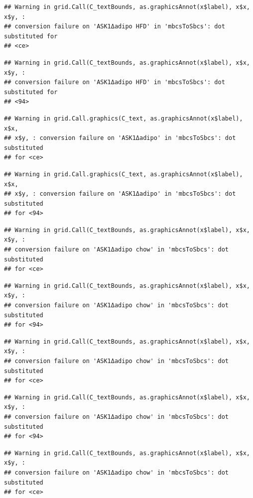 \documentclass[]{book}
\begin{document}
\begin{verbatim}
## Warning in grid.Call(C_textBounds, as.graphicsAnnot(x$label), x$x, x$y, :
## conversion failure on 'ASK1Δadipo HFD' in 'mbcsToSbcs': dot substituted for
## <ce>
\end{verbatim}

\begin{verbatim}
## Warning in grid.Call(C_textBounds, as.graphicsAnnot(x$label), x$x, x$y, :
## conversion failure on 'ASK1Δadipo HFD' in 'mbcsToSbcs': dot substituted for
## <94>
\end{verbatim}

\begin{verbatim}
## Warning in grid.Call.graphics(C_text, as.graphicsAnnot(x$label), x$x,
## x$y, : conversion failure on 'ASK1Δadipo' in 'mbcsToSbcs': dot substituted
## for <ce>
\end{verbatim}

\begin{verbatim}
## Warning in grid.Call.graphics(C_text, as.graphicsAnnot(x$label), x$x,
## x$y, : conversion failure on 'ASK1Δadipo' in 'mbcsToSbcs': dot substituted
## for <94>
\end{verbatim}

\begin{verbatim}
## Warning in grid.Call(C_textBounds, as.graphicsAnnot(x$label), x$x, x$y, :
## conversion failure on 'ASK1Δadipo chow' in 'mbcsToSbcs': dot substituted
## for <ce>
\end{verbatim}

\begin{verbatim}
## Warning in grid.Call(C_textBounds, as.graphicsAnnot(x$label), x$x, x$y, :
## conversion failure on 'ASK1Δadipo chow' in 'mbcsToSbcs': dot substituted
## for <94>
\end{verbatim}

\begin{verbatim}
## Warning in grid.Call(C_textBounds, as.graphicsAnnot(x$label), x$x, x$y, :
## conversion failure on 'ASK1Δadipo chow' in 'mbcsToSbcs': dot substituted
## for <ce>
\end{verbatim}

\begin{verbatim}
## Warning in grid.Call(C_textBounds, as.graphicsAnnot(x$label), x$x, x$y, :
## conversion failure on 'ASK1Δadipo chow' in 'mbcsToSbcs': dot substituted
## for <94>
\end{verbatim}

\begin{verbatim}
## Warning in grid.Call(C_textBounds, as.graphicsAnnot(x$label), x$x, x$y, :
## conversion failure on 'ASK1Δadipo chow' in 'mbcsToSbcs': dot substituted
## for <ce>
\end{verbatim}
\end{document}
